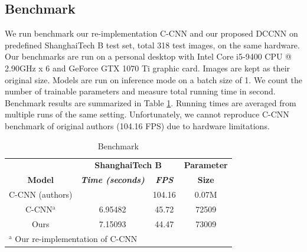 

\subsection{Benchmark}

We run benchmark our re-implementation C-CNN \cite{9053780} and our proposed DCCNN on predefined ShanghaiTech B test set, total 318 test images, on the same hardware. Our benchmarks are run on a personal desktop with Intel Core i5-9400 CPU @ 2.90GHz x 6 and GeForce GTX 1070 Ti graphic card. Images are kept as their original size. Models are run on inference mode on a batch size of 1. We count the number of trainable parameters and measure total running time in second. Benchmark results are summarized in Table \ref{tab:benchmark-result}. Running times are averaged from multiple runs of the same setting. Unfortunately, we cannot reproduce C-CNN benchmark of original authors \cite{9053780} (104.16 FPS) due to hardware limitations. 

\begin{table}[htbp]
\caption{\label{tab:benchmark-result}  Benchmark}
\begin{center}
\begin{tabular}{|c|c|c|c|}
\hline
\textbf{}&\multicolumn{2}{|c|}{\textbf{ShanghaiTech B}}&\textbf{Parameter} \\
\cline{1-3}
\textbf{Model} & \textbf{\textit{ Time (seconds) }}& \textbf{\textit{FPS}}&\textbf{Size} \\
\hline
C-CNN (authors) \cite{9053780} &  &  104.16 & 0.07M \\
\hline
C-CNN$^{\mathrm{a}}$  & 6.95482 & 45.72 & 72509   \\
\hline
Ours &  7.15093 & 44.47 & 73009 \\
\hline
\multicolumn{4}{l}{$^{\mathrm{a}}$ Our re-implementation of C-CNN \cite{9053780}}
\end{tabular}

\end{center}
\end{table}

